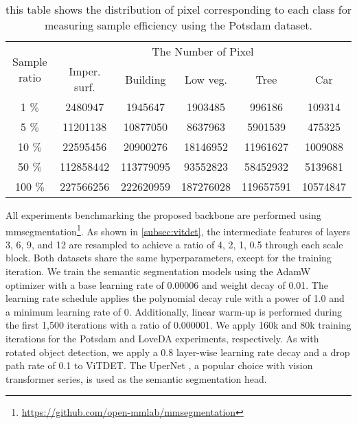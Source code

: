 \begin{table*}[ht]{\textwidth=0mm}
{\begin{tabular}{c | l | c c c c c | c | c }
    \end{tabular}
    }
    \label{tab:potsdam sample efficiency table}
\end{table*} \begin{table}[ht]
    \centering
    \caption{this table shows the distribution of pixel corresponding to each class for measuring sample efficiency using the Potsdam dataset.}
    \setlength{\tabcolsep}{2.75pt}
    \renewcommand{\arraystretch}{1.25}
    {
    \begin{tabular}{c|c c c c c}
        \hline
        \multirow{2}{*}{Sample ratio} & \multicolumn{5}{c}{The Number of Pixel} \\ \cline{2-6}
        & Imper. surf. & Building & Low veg. & Tree & Car \\ \hline

        1 $\%$ & 2480947 & 1945647 & 1903485 & 996186 & 109314 \\ \hline
        5 $\%$ & 11201138 & 10877050 & 8637963 & 5901539 & 475325 \\ \hline
        10 $\%$ & 22595456 & 20900276 & 18146952 & 11961627 & 1009088 \\ \hline
        50 $\%$ & 112858442 & 113779095 & 93552823 & 58452932 & 5139681 \\ \hline
        100 $\%$ & 227566256 & 222620959 & 187276028 & 119657591 & 10574847 \\ \hline
        
    \end{tabular}
    }
    \label{tab:potsdam label ratio}
\end{table} 
All experiments benchmarking the proposed backbone are performed using mmsegmentation\footnote{\url{https://github.com/open-mmlab/mmsegmentation}}. As shown in \autoref{subsec:vitdet}, the intermediate features of layers 3, 6, 9, and 12 are resampled to achieve a ratio of 4, 2, 1, 0.5 through each scale block. Both datasets share the same hyperparameters, except for the training iteration. We train the semantic segmentation models using the AdamW optimizer with a base learning rate of 0.00006 and weight decay of 0.01. The learning rate schedule applies the polynomial decay rule with a power of 1.0 and a minimum learning rate of 0. Additionally, linear warm-up is performed during the first 1,500 iterations with a ratio of 0.000001. We apply 160k and 80k training iterations for the Potsdam and LoveDA experiments, respectively. As with rotated object detection, we apply a 0.8 layer-wise learning rate decay and a drop path rate of 0.1 to ViTDET. The UperNet \cite{xiao2018unified}, a popular choice with vision transformer series, is used as the semantic segmentation head.

